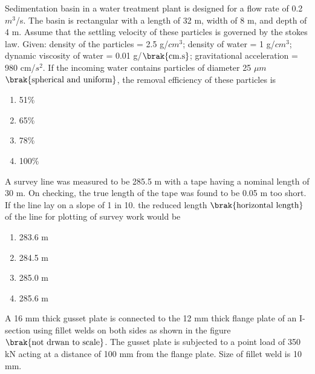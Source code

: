 \item Sedimentation basin in a water treatment plant is designed for a flow rate of 0.2 $m^3$/s. The basin is rectangular with a length of 32 m, width of 8 m, and depth of 4 m. Assume that the settling velocity of these particles is governed by the stokes law. Given: density of the particles = 2.5 g/$cm^3$; density of water = 1 g/$cm^3$; dynamic viscosity of water = 0.01 g/$\brak{\text{cm.s}}$; gravitational acceleration = 980 cm/$s^2$. If the incoming water contains particles of diameter 25 $\mu m$ $\brak{\text{spherical and uniform}}$, the removal efficiency of these particles is
	\begin{enumerate}
                \item 51\%
                \item 65\%
                \item 78\%
                \item 100\%
        \end{enumerate}
\item A survey line was measured to be 285.5 m with a tape having a nominal length of 30 m. On checking, the true length of the tape was found to be 0.05 m too short. If the line lay on a slope of 1 in 10. the reduced length $\brak{\text{horizontal length}}$ of the line for plotting of survey work would be
	\begin{enumerate}
                \item 283.6 m
                \item 284.5 m
                \item 285.0 m
                \item 285.6 m
        \end{enumerate}
\item A 16 mm thick gusset plate is connected to the 12 mm thick flange plate of an I-section using fillet welds on both sides as shown in the figure $\brak{\text{not drwan to scale}}$. The gusset plate is subjected to a point load of 350 kN acting at a distance of 100 mm from the flange plate. Size of fillet weld is 10 mm.
